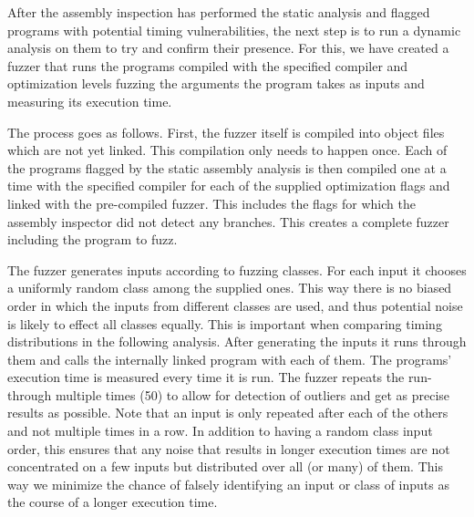 After the assembly inspection has performed the static analysis and flagged programs with potential timing vulnerabilities, the next step is to run a dynamic analysis on them to try and confirm their presence. For this, we have created a fuzzer that runs the programs compiled with the specified compiler and optimization levels fuzzing the arguments the program takes as inputs and measuring its execution time. 

The process goes as follows. First, the fuzzer itself is compiled into object files which are not yet linked. This compilation only needs to happen once. Each of the programs flagged by the static assembly analysis is then compiled one at a time with the specified compiler for each of the supplied optimization flags and linked with the pre-compiled fuzzer. This includes the flags for which the assembly inspector did not detect any branches. This creates a complete fuzzer including the program to fuzz.

The fuzzer generates inputs according to fuzzing classes. For each input it chooses a uniformly random class among the supplied ones. This way there is no biased order in which the inputs from different classes are used, and thus potential noise is likely to effect all classes equally. This is important when comparing timing distributions in the following analysis. After generating the inputs it runs through them and calls the internally linked program with each of them. The programs' execution time is measured every time it is run. The fuzzer repeats the run-through multiple times (50) to allow for detection of outliers and get as precise results as possible. Note that an input is only repeated after each of the others and not multiple times in a row. In addition to having a random class input order, this ensures that any noise that results in longer execution times are not concentrated on a few inputs but distributed over all (or many) of them. This way we minimize the chance of falsely identifying an input or class of inputs as the course of a longer execution time.

